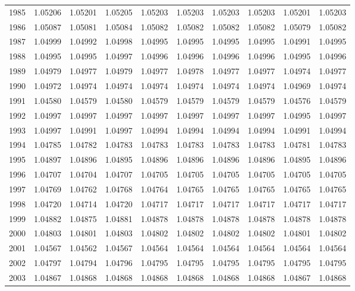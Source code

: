 \begin{tabular}{cccccccccc}
  1985 & 1.05206 & 1.05201 & 1.05205 & 1.05203 & 1.05203 & 1.05203 & 1.05203 & 1.05201 & 1.05203 \\ 
  1986 & 1.05087 & 1.05081 & 1.05084 & 1.05082 & 1.05082 & 1.05082 & 1.05082 & 1.05079 & 1.05082 \\ 
  1987 & 1.04999 & 1.04992 & 1.04998 & 1.04995 & 1.04995 & 1.04995 & 1.04995 & 1.04991 & 1.04995 \\ 
  1988 & 1.04995 & 1.04995 & 1.04997 & 1.04996 & 1.04996 & 1.04996 & 1.04996 & 1.04995 & 1.04996 \\ 
  1989 & 1.04979 & 1.04977 & 1.04979 & 1.04977 & 1.04978 & 1.04977 & 1.04977 & 1.04974 & 1.04977 \\ 
  1990 & 1.04972 & 1.04974 & 1.04974 & 1.04974 & 1.04974 & 1.04974 & 1.04974 & 1.04969 & 1.04974 \\ 
  1991 & 1.04580 & 1.04579 & 1.04580 & 1.04579 & 1.04579 & 1.04579 & 1.04579 & 1.04576 & 1.04579 \\ 
  1992 & 1.04997 & 1.04997 & 1.04997 & 1.04997 & 1.04997 & 1.04997 & 1.04997 & 1.04995 & 1.04997 \\ 
  1993 & 1.04997 & 1.04991 & 1.04997 & 1.04994 & 1.04994 & 1.04994 & 1.04994 & 1.04991 & 1.04994 \\ 
  1994 & 1.04785 & 1.04782 & 1.04783 & 1.04783 & 1.04783 & 1.04783 & 1.04783 & 1.04781 & 1.04783 \\ 
  1995 & 1.04897 & 1.04896 & 1.04895 & 1.04896 & 1.04896 & 1.04896 & 1.04896 & 1.04895 & 1.04896 \\ 
  1996 & 1.04707 & 1.04704 & 1.04707 & 1.04705 & 1.04705 & 1.04705 & 1.04705 & 1.04705 & 1.04705 \\ 
  1997 & 1.04769 & 1.04762 & 1.04768 & 1.04764 & 1.04765 & 1.04765 & 1.04765 & 1.04765 & 1.04765 \\ 
  1998 & 1.04720 & 1.04714 & 1.04720 & 1.04717 & 1.04717 & 1.04717 & 1.04717 & 1.04717 & 1.04717 \\ 
  1999 & 1.04882 & 1.04875 & 1.04881 & 1.04878 & 1.04878 & 1.04878 & 1.04878 & 1.04878 & 1.04878 \\ 
  2000 & 1.04803 & 1.04801 & 1.04803 & 1.04802 & 1.04802 & 1.04802 & 1.04802 & 1.04801 & 1.04802 \\ 
  2001 & 1.04567 & 1.04562 & 1.04567 & 1.04564 & 1.04564 & 1.04564 & 1.04564 & 1.04564 & 1.04564 \\ 
  2002 & 1.04797 & 1.04794 & 1.04796 & 1.04795 & 1.04795 & 1.04795 & 1.04795 & 1.04795 & 1.04795 \\ 
  2003 & 1.04867 & 1.04868 & 1.04868 & 1.04868 & 1.04868 & 1.04868 & 1.04868 & 1.04867 & 1.04868 \\ 

\end{tabular}
